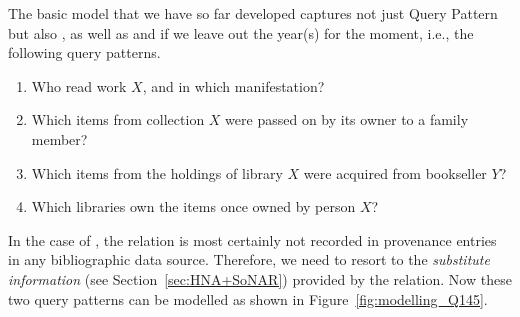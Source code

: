 The basic model that we have so far developed captures not just Query Pattern~
but also , as well as  and  if we leave out the year(s) for the moment, i.e.,
the following query patterns.
%
\begin{enumerate}
  \item[\exaquery{1$^-$}]
    Who read
    work $X$, and
    in which manifestation?
  \item[\exaquery{4\phantom{$^-$}}]
    Which items from collection $X$ were passed on by its owner to a family member?
  \item[\exaquery{5$^-$}]
    Which items from the holdings of library $X$ were acquired from bookseller $Y$?
  \item[\exaquery{8}\phantom{$^-$}]
    Which libraries own the items once owned by person $X$?
\end{enumerate}
%
In the case of , the relation  is most certainly not recorded in provenance entries
in any bibliographic data source. Therefore, we need to resort to the \emph{substitute information}
(see Section~\ref{sec:HNA+SoNAR}) provided by the  relation.
Now these two query patterns
can be modelled as shown in Figure~\ref{fig:modelling_Q145}.

